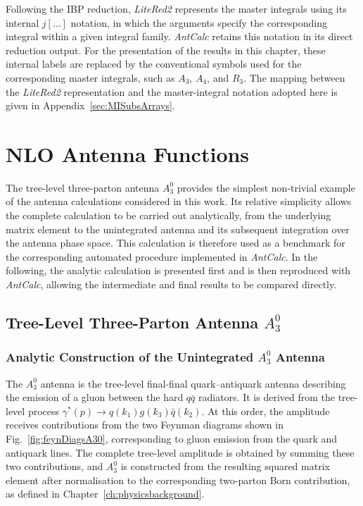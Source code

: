 Following the IBP reduction, \textit{LiteRed2} represents the master integrals using its internal
$j[\ldots]$ notation, in which the arguments specify the corresponding integral within a given
integral family. \textit{AntCalc} retains this notation in its direct reduction output. For the
presentation of the results in this chapter, these internal labels are replaced by the conventional
symbols used for the corresponding master integrals, such as $A_3$, $A_4$, and $R_3$. The
mapping between the \textit{LiteRed2} representation and the master-integral notation adopted here
is given in Appendix~\ref{sec:MISubsArrays}.

\section{NLO Antenna Functions}

The tree-level three-parton antenna $A_3^0$ provides the simplest non-trivial example of the antenna
calculations considered in this work. Its relative simplicity allows the complete calculation to be
carried out analytically, from the underlying matrix element to the unintegrated antenna and its
subsequent integration over the antenna phase space. This calculation is therefore used as a benchmark
for the corresponding automated procedure implemented in \textit{AntCalc}. In the following, the
analytic calculation is presented first and is then reproduced with \textit{AntCalc}, allowing the
intermediate and final results to be compared directly.

\subsection{Tree-Level Three-Parton Antenna $A_3^0$}\label{sec:matDerivation}

\subsubsection*{Analytic Construction of the Unintegrated $A_3^0$ Antenna}

The $A_3^0$ antenna is the tree-level final-final quark--antiquark antenna describing the emission of a
gluon between the hard $q\bar q$ radiators. It is derived from the tree-level process
$\gamma^*(p)\to q(k_1)g(k_3)\bar q(k_2)$. At this order, the amplitude receives contributions from the
two Feynman diagrams shown in Fig.~\ref{fig:feynDiagsA30}, corresponding to gluon emission from the
quark and antiquark lines. The complete tree-level amplitude is obtained by summing these two
contributions, and $A_3^0$ is constructed from the resulting squared matrix element after
normalisation to the corresponding two-parton Born contribution, as defined in
Chapter~\ref{ch:physicsbackground}.

